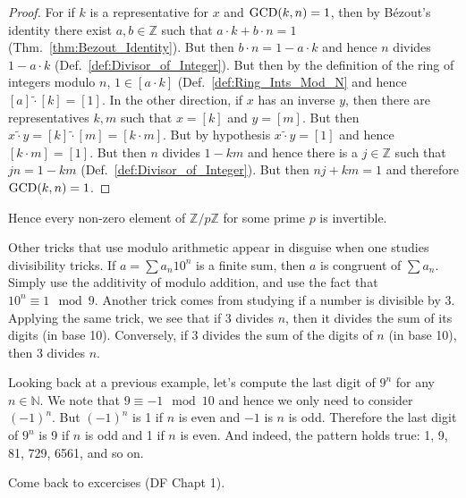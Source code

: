     \begin{proof}
        For if $k$ is a representative for $x$ and $\mathrm{GCD}(k,n)=1$, then
        by B\'{e}zout's identity there exist $a,b\in\mathbb{Z}$ such
        that $a\cdot{k}+b\cdot{n}=1$ (Thm.~\ref{thm:Bezout_Identity}).
        But then $b\cdot{n}=1-a\cdot{k}$ and hence $n$ divides
        $1-a\cdot{k}$ (Def.~\ref{def:Divisor_of_Integer}). But then by
        the definition of the ring of integers modulo $n$,
        $1\in[a\cdot{k}]$ (Def.~\ref{def:Ring_Ints_Mod_N} and
        hence $[a]\tilde{\cdot}[k]=[1]$. In the other direction, if
        $x$ has an inverse $y$, then there are representatives $k,m$
        such that $x=[k]$ and $y=[m]$. But then
        $x\tilde{\cdot}{y}=[k]\tilde{\cdot}[m]=[k\cdot{m}]$. But by
        hypothesis $x\tilde{\cdot}{y}=[1]$ and hence $[k\cdot{m}]=[1]$.
        But then $n$ divides $1-km$ and hence there is a
        $j\in\mathbb{Z}$ such that $jn=1-km$
        (Def.~\ref{def:Divisor_of_Integer}). But then $nj+km=1$ and
        therefore $\mathrm{GCD}(k,n)=1$.
    \end{proof}
    Hence every non-zero element of $\mathbb{Z}/p\mathbb{Z}$ for some prime
    $p$ is invertible.
    \begin{example}
        Other tricks that use modulo arithmetic appear in disguise when one
        studies divisibility tricks. If $a=\sum{a}_{n}10^{n}$ is a finite
        sum, then $a$ is congruent of $\sum{a}_{n}$. Simply use the
        additivity of modulo addition, and use the fact that
        $10^{n}\equiv{1}\mod{9}$. Another trick comes from studying if a
        number is divisible by 3. Applying the same trick, we see that if
        3 divides $n$, then it divides the sum of its digits (in base 10).
        Conversely, if 3 divides the sum of the digits of $n$ (in base 10),
        then 3 divides $n$.
    \end{example}
    \begin{example}
        Looking back at a previous example, let's compute the last digit of
        $9^{n}$ for any $n\in\mathbb{N}$. We note that
        $9\equiv\minus{1}\mod{10}$ and hence we only need to consider
        $(\minus{1})^{n}$. But $(\minus{1})^{n}$ is 1 if $n$ is even and
        $\minus{1}$ is $n$ is odd. Therefore the last digit of $9^{n}$ is
        9 if $n$ is odd and 1 if $n$ is even. And indeed, the pattern holds
        true: 1, 9, 81, 729, 6561, and so on.
    \end{example}
    Come back to excercises (DF Chapt 1).